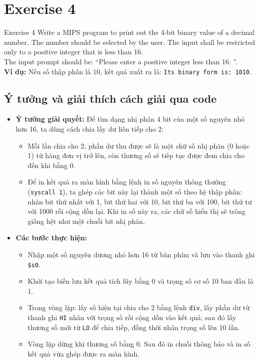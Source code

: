 \documentclass[a4paper]{article}
\numberwithin{figure}{section}
\numberwithin{table}{section}
\begin{document}
\pagebreak

\section{Exercise 4}

\begin{problembox}{Exercise 4}
Write a MIPS program to print out the 4-bit binary value of a decimal number. The number should be selected by the user. The input shall be restricted only to a positive integer that is less than 16.\\
The input prompt should be: ``Please enter a positive integer less than 16: ''.\\
\textbf{Ví dụ:} Nếu số thập phân là $10$, kết quả xuất ra là: \texttt{Its binary form is: 1010}.
\end{problembox}

\subsection{Ý tưởng và giải thích cách giải qua code}
\begin{itemize}[leftmargin=*]
    \item \textbf{Ý tưởng giải quyết:}
    Để tìm dạng nhị phân 4 bit của một số nguyên nhỏ hơn 16, ta dùng cách chia lấy dư liên tiếp cho 2:
    \begin{itemize}[leftmargin=*]
        \item Mỗi lần chia cho 2, phần dư thu được sẽ là một chữ số nhị phân (0 hoặc 1) từ hàng đơn vị trở lên, còn thương số sẽ tiếp tục được đem chia cho đến khi bằng 0.
        \item Để in kết quả ra màn hình bằng lệnh in số nguyên thông thường (\texttt{syscall 1}), ta ghép các bit này lại thành một số theo hệ thập phân: nhân bit thứ nhất với 1, bit thứ hai với 10, bit thứ ba với 100, bit thứ tư với 1000 rồi cộng dồn lại. Khi in số này ra, các chữ số hiển thị sẽ trông giống hệt như một chuỗi bit nhị phân.
    \end{itemize}
    
    \item \textbf{Các bước thực hiện:}
    \begin{itemize}[leftmargin=*]
        \item Nhập một số nguyên dương nhỏ hơn 16 từ bàn phím và lưu vào thanh ghi \texttt{\$s0}.
        \item Khởi tạo biến lưu kết quả tích lũy bằng 0 và trọng số cơ số 10 ban đầu là 1.
        \item Trong vòng lặp: lấy số hiện tại chia cho 2 bằng lệnh \texttt{div}, lấy phần dư từ thanh ghi \texttt{HI} nhân với trọng số rồi cộng dồn vào kết quả; sau đó lấy thương số mới từ \texttt{LO} để chia tiếp, đồng thời nhân trọng số lên 10 lần.
        \item Vòng lặp dừng khi thương số bằng 0. Sau đó in chuỗi thông báo và in số kết quả vừa ghép được ra màn hình.
    \end{itemize}
\end{itemize}
\end{document}
